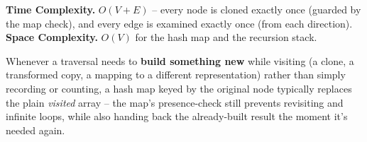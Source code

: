 \begin{complexitybox}
\textbf{Time Complexity.} $O(V+E)$ -- every node is cloned exactly
once (guarded by the map check), and every edge is examined exactly
once (from each direction).
\textbf{Space Complexity.} $O(V)$ for the hash map and the recursion
stack.
\end{complexitybox}

\begin{takeawaybox}
Whenever a traversal needs to \textbf{build something new} while
visiting (a clone, a transformed copy, a mapping to a different
representation) rather than simply recording or counting, a hash map
keyed by the original node typically replaces the plain
\textit{visited} array -- the map's presence-check still prevents
revisiting and infinite loops, while also handing back the
already-built result the moment it's needed again.
\end{takeawaybox}
